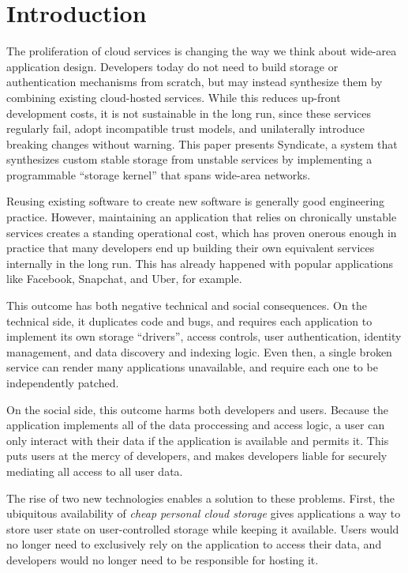 \section{Introduction}
\label{sec:introduction}

The proliferation of cloud services is changing the way we think about
wide-area application design.  Developers today do not need to build storage
or authentication mechanisms from scratch, but may instead synthesize them by
combining existing cloud-hosted services.  While this reduces up-front
development costs, it is not sustainable in the long run,
since these services regularly fail, adopt incompatible trust models, and
unilaterally introduce breaking changes without warning.  This paper
presents Syndicate, a system that synthesizes custom stable storage
from unstable services by implementing a programmable ``storage kernel'' that spans
wide-area networks.

Reusing existing software to create new software is generally good engineering practice.
However, maintaining an application that relies on chronically unstable services
creates a standing operational cost, which has proven onerous enough in practice that
many developers end up building their own equivalent services internally in the
long run.  This has already happened with popular applications
like Facebook, Snapchat, and Uber, for example.

This outcome has both negative technical and social consequences.  On the
technical side, it duplicates code and bugs, and requires each application to
implement its own storage ``drivers'', access controls, user authentication,
identity management, and data discovery and indexing logic.  Even then, a single
broken service can render many applications unavailable, and require each one
to be independently patched.

On the social side, this outcome harms both developers and users.  Because the
application implements all of the data proccessing and access logic, a user can
only interact with their data if the application is available and permits it.  This puts users at
the mercy of developers, and makes developers liable for securely mediating all access
to all user data.

The rise of two new technologies enables a solution to these problems.  First, the
ubiquitous availability of \textit{cheap personal cloud storage} gives
applications a way to store user state on user-controlled storage while keeping
it available.  Users would no longer need to exclusively rely on the application to access their data,
and developers would no longer need to be responsible for hosting it.


